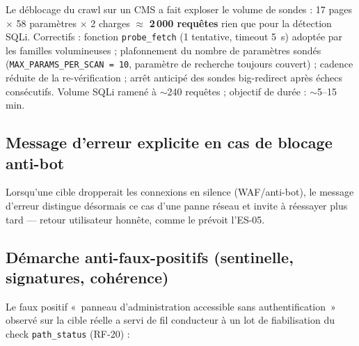 \documentclass[11pt,a4paper]{report}
\newcommand{\code}[1]{\texttt{#1}}
\begin{document}
Le déblocage du crawl sur un CMS a fait exploser le volume de sondes : 17 pages
$\times$ 58 paramètres $\times$ 2 charges $\approx$ \textbf{2\,000 requêtes} rien que pour
la détection SQLi. Correctifs : fonction \code{probe\_fetch} (1 tentative, timeout 5~s)
adoptée par les familles volumineuses ; plafonnement du nombre de paramètres sondés
(\code{MAX\_PARAMS\_PER\_SCAN = 10}, paramètre de recherche toujours couvert) ; cadence
réduite de la re-vérification ; arrêt anticipé des sondes big-redirect après échecs
consécutifs. Volume SQLi ramené à $\sim$240 requêtes ; objectif de durée : $\sim$5--15 min.

\subsection{Message d'erreur explicite en cas de blocage anti-bot}

Lorsqu'une cible dropperait les connexions en silence (WAF/anti-bot), le message d'erreur
distingue désormais ce cas d'une panne réseau et invite à réessayer plus tard --- retour
utilisateur honnête, comme le prévoit l'ES-05.

\subsection{Démarche anti-faux-positifs (sentinelle, signatures, cohérence)}

Le faux positif «~panneau d'administration accessible sans authentification~» observé sur
la cible réelle a servi de fil conducteur à un lot de fiabilisation du check
\code{path\_status} (RF-20) :
\end{document}
